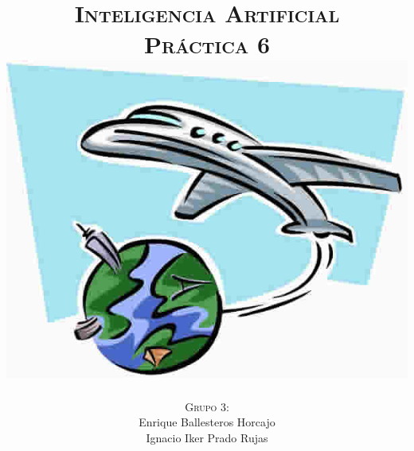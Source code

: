 \documentclass[11pt, a4paper, spanish, openright, twoside]{book}
\begin{document}
 

\title{\Huge{\textsc{Inteligencia Artificial}} \\
	\vspace{0.7cm}
	 \textsc{\Large{Práctica 6}} \\
	\vspace{1.5cm}
	\includegraphics[scale=0.45]{viaje}}
\author{\textsc{Grupo 3:}\\
	Enrique Ballesteros Horcajo\\
	Ignacio Iker Prado Rujas}
\date{\Today}
\maketitle

\newpage
\mbox{}
\thispagestyle{empty}						%
\newpage


\tableofcontents 							%

\newpage
\mbox{}
\thispagestyle{empty}						%
\newpage


\vspace{3cm}


\newpage
\end{document}
